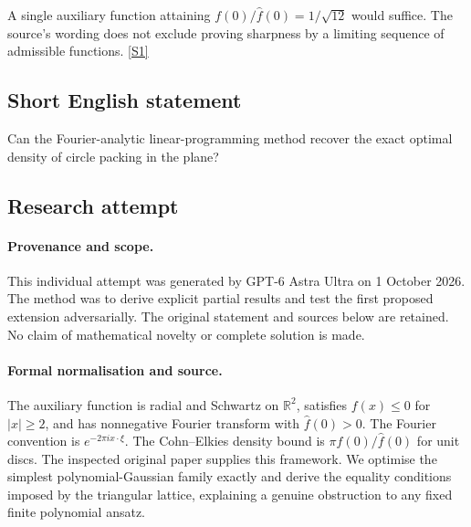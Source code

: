 \documentclass[11pt,a4paper]{article}
\newcommand{\R}{\mathbb{R}}
\newcommand{\sref}[2]{\hyperlink{source:#1:#2}{[S#2]}}
\begin{document}
A single auxiliary function attaining $f(0)/\widehat f(0)=1/\sqrt{12}$ would suffice. The source’s wording does not exclude proving sharpness by a limiting sequence of admissible functions. \sref{statement}{1}

\subsection{Short English statement}

Can the Fourier-analytic linear-programming method recover the exact optimal density of circle packing in the plane?

\subsection{Research attempt}

\paragraph{Provenance and scope.}
This individual attempt was generated by GPT-6 Astra Ultra on 1 October 2026. The method was to derive explicit partial results and test the first proposed extension adversarially. The original statement and sources below are retained. No claim of mathematical novelty or complete solution is made.

\paragraph{Formal normalisation and source.}
The auxiliary function is radial and Schwartz on $\R^2$, satisfies $f(x)\leq0$ for $|x|\geq2$, and has nonnegative Fourier transform with $\widehat f(0)>0$. The Fourier convention is $e^{-2\pi ix\cdot\xi}$. The Cohn--Elkies density bound is $\pi f(0)/\widehat f(0)$ for unit discs. The inspected original paper supplies this framework. We optimise the simplest polynomial-Gaussian family exactly and derive the equality conditions imposed by the triangular lattice, explaining a genuine obstruction to any fixed finite polynomial ansatz.
\end{document}
